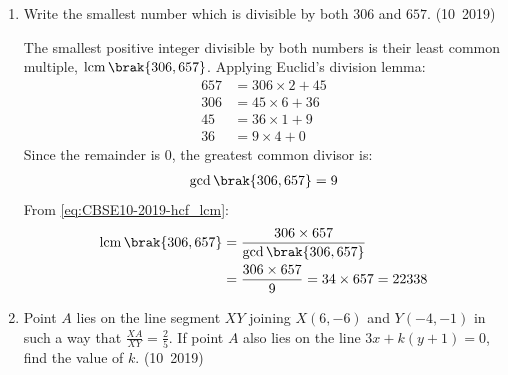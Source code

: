 \begin{enumerate}[label=\thesubsection.\arabic*, ref=\thesubsection.\theenumi]
	\item Write the smallest number which is divisible by both $306$ and $657$.
	\hfill (10~2019)
	
	\solution
	The smallest positive integer divisible by both numbers is their least common multiple, $\operatorname{lcm}\brak{306, 657}$.
	Applying Euclid's division lemma:
	\begin{align}
		657 &= 306 \times 2 + 45 \\
		306 &= 45 \times 6 + 36 \\
		45 &= 36 \times 1 + 9 \\
		36 &= 9 \times 4 + 0
	\end{align}
	Since the remainder is $0$, the greatest common divisor is:
	\begin{align}
		\gcd\brak{306, 657} = 9
	\end{align}
	From \eqref{eq:CBSE10-2019-hcf_lcm}:
	\begin{align}
		\operatorname{lcm}\brak{306, 657} &= \frac{306 \times 657}{\gcd\brak{306, 657}} \\
		&= \frac{306 \times 657}{9} = 34 \times 657 = 22338
	\end{align}

	\item Point $A$ lies on the line segment $XY$ joining $X(6,-6)$ and $Y(-4,-1)$ in such a way that $\frac{XA}{XY}=\frac{2}{5}$. If point $A$ also lies on the line $3x+k(y+1)=0$, find the value of $k$.
	\hfill (10~2019)
	

\end{enumerate}
